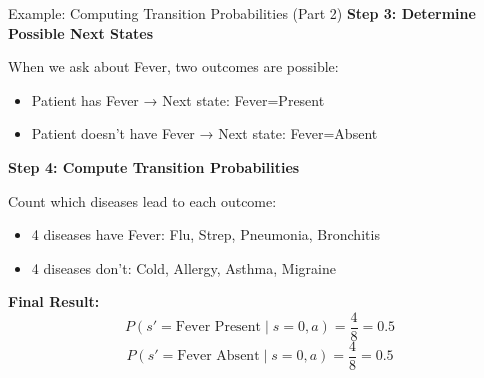 \documentclass[aspectratio=169]{beamer}
\begin{document}
\begin{frame}{Example: Computing Transition Probabilities (Part 2)}
    \textbf{Step 3: Determine Possible Next States}
    
    \vspace{0.2cm}
    
    When we ask about Fever, two outcomes are possible:
    \begin{itemize}
        \item Patient has Fever → Next state: Fever=Present
        \item Patient doesn't have Fever → Next state: Fever=Absent
    \end{itemize}
    
    \vspace{0.3cm}
    
    \textbf{Step 4: Compute Transition Probabilities}
    
    \vspace{0.2cm}
    
    Count which diseases lead to each outcome:
    \begin{itemize}
        \item 4 diseases have Fever: Flu, Strep, Pneumonia, Bronchitis
        \item 4 diseases don't: Cold, Allergy, Asthma, Migraine
    \end{itemize}
    
    \vspace{0.2cm}
    
    \textbf{Final Result:}
    \vspace{-0.1cm}
    \[P(s' = \text{Fever Present} \mid s=0, a) = \frac{4}{8} = 0.5\]
    \vspace{-0.3cm}
    \[P(s' = \text{Fever Absent} \mid s=0, a) = \frac{4}{8} = 0.5\]
\end{frame}
\end{document}
